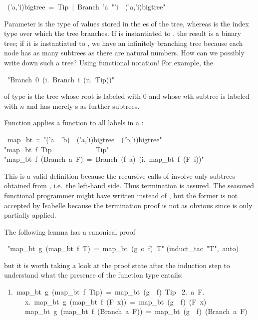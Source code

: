\begin{isabelle}%
~('a,'i)bigtree~=~Tip~|~Branch~'a~{"}'i~{\isasymRightarrow}~('a,'i)bigtree{"}%
\begin{isamarkuptext}%
\noindent Parameter  is the type of values stored in
the es of the tree, whereas  is the index
type over which the tree branches. If  is instantiated to
, the result is a binary tree; if it is instantiated to
, we have an infinitely branching tree because each node
has as many subtrees as there are natural numbers. How can we possibly
write down such a tree? Using functional notation! For example, the%
\end{isamarkuptext}%
~{"}Branch~0~({\isasymlambda}i.~Branch~i~({\isasymlambda}n.~Tip)){"}%
\begin{isamarkuptext}%
\noindent of type  is the tree whose
root is labeled with 0 and whose $n$th subtree is labeled with $n$ and
has merely s as further subtrees.

Function  applies a function to all labels in a :%
\end{isamarkuptext}%
~map\_bt~::~{"}('a~{\isasymRightarrow}~'b)~{\isasymRightarrow}~('a,'i)bigtree~{\isasymRightarrow}~('b,'i)bigtree{"}\isanewline
{}\isanewline
{"}map\_bt~f~Tip~~~~~~~~~~=~Tip{"}\isanewline
{"}map\_bt~f~(Branch~a~F)~=~Branch~(f~a)~({\isasymlambda}i.~map\_bt~f~(F~i)){"}%
\begin{isamarkuptext}%
\noindent This is a valid  definition because the
recursive calls of  involve only subtrees obtained from
, i.e.\ the left-hand side. Thus termination is assured.  The
seasoned functional programmer might have written  instead
of , but the former is not accepted by
Isabelle because the termination proof is not as obvious since
 is only partially applied.

The following lemma has a canonical proof%
\end{isamarkuptext}%
~{"}map\_bt~g~(map\_bt~f~T)~=~map\_bt~(g~o~f)~T{"}\isanewline
{}(induct\_tac~{"}T{"},~auto)%
\begin{isamarkuptext}%
\noindent
but it is worth taking a look at the proof state after the induction step
to understand what the presence of the function type entails:
\begin{isabellepar}%
~1.~map\_bt~g~(map\_bt~f~Tip)~=~map\_bt~(g~{\isasymcirc}~f)~Tip\isanewline
~2.~{\isasymAnd}a~F.\isanewline
~~~~~~{\isasymforall}x.~map\_bt~g~(map\_bt~f~(F~x))~=~map\_bt~(g~{\isasymcirc}~f)~(F~x)~{\isasymLongrightarrow}\isanewline
~~~~~~map\_bt~g~(map\_bt~f~(Branch~a~F))~=~map\_bt~(g~{\isasymcirc}~f)~(Branch~a~F)%
\end{isabellepar}%
\end{isamarkuptext}%
\end{isabelle}%
